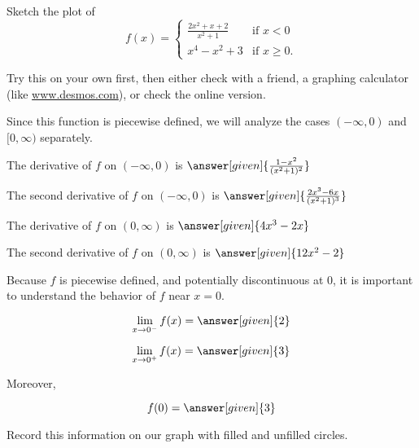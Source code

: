 \documentclass{ximera}
\begin{document}
\begin{example}
\begin{explanation}
\begin{hint}
\end{hint}

\end{explanation}
\end{example}

\begin{example}
Sketch the plot of 
\[
f(x) = \begin{cases} \frac{2x^2+x+2}{x^2+1} &\text{if $x<0$} \\
x^4-x^2+3 &\text{if $x \geq 0$}.
\end{cases}
\]
\begin{explanation}

 Try this on your own first, then either check with a friend, a graphing calculator (like \href{www.desmos.com}{www.desmos.com}), or check the online version.

\begin{hint}
	Since this function is piecewise defined, we will analyze the cases $(-\infty,0)$ and $[0,\infty)$ separately.
\end{hint}

\begin{hint}
		The derivative of $f$ on $(-\infty, 0)$ is $\answer[given]{\frac{1-x^2}{(x^2+1)^2}}$
		
		The second derivative of $f$ on $(-\infty, 0)$ is $\answer[given]{\frac{2x^3-6x}{(x^2+1)^3}}$

		The derivative of $f$ on $(0, \infty)$ is $\answer[given]{4x^3-2x}$

		The second derivative of $f$ on $(0, \infty)$ is $\answer[given]{12x^2-2}$

\end{hint}

\begin{hint}
	Because $f$ is piecewise defined, and potentially discontinuous at $0$, it is important to understand the behavior of $f$ near $x = 0$.
	
	\[
		\lim_{x \to 0^-} f(x) = \answer[given]{2}
	\]
	
	\[
		\lim_{x \to 0^+} f(x) = \answer[given]{3}
	\]
	
	Moreover, 
	
	\[
	f(0) = \answer[given]{3}
	\]
	
	Record this information on our graph with filled and unfilled circles.
	\end{hint}
	

\end{explanation}
\end{example}
\end{document}

